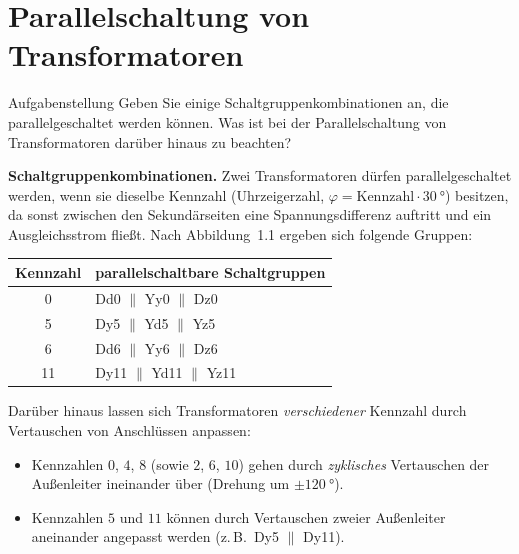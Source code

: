 \section{Parallelschaltung von Transformatoren}\label{sec:a1}

\begin{aufgabe}{Aufgabenstellung}
Geben Sie einige Schaltgruppenkombinationen an, die parallelgeschaltet werden können. Was ist bei der Parallelschaltung von Transformatoren darüber hinaus zu beachten?
\end{aufgabe}

\textbf{Schaltgruppenkombinationen.} Zwei Transformatoren dürfen parallelgeschaltet werden, wenn sie dieselbe Kennzahl (Uhrzeigerzahl, $\varphi = \text{Kennzahl}\cdot\SI{30}{\degree}$) besitzen, da sonst zwischen den Sekundärseiten eine Spannungsdifferenz auftritt und ein Ausgleichsstrom fließt. Nach Abbildung~1.1 ergeben sich folgende Gruppen:

\begin{center}
\begin{tabular}{@{}cl@{}}
\toprule
Kennzahl & parallelschaltbare Schaltgruppen\\
\midrule
0  & Dd0 $\parallel$ Yy0 $\parallel$ Dz0\\
5  & Dy5 $\parallel$ Yd5 $\parallel$ Yz5\\
6  & Dd6 $\parallel$ Yy6 $\parallel$ Dz6\\
11 & Dy11 $\parallel$ Yd11 $\parallel$ Yz11\\
\bottomrule
\end{tabular}
\end{center}

Darüber hinaus lassen sich Transformatoren \emph{verschiedener} Kennzahl durch Vertauschen von Anschlüssen anpassen:
\begin{itemize}[nosep]
  \item Kennzahlen $0$, $4$, $8$ (sowie $2$, $6$, $10$) gehen durch \emph{zyklisches} Vertauschen der Außenleiter ineinander über (Drehung um $\pm\SI{120}{\degree}$).
  \item Kennzahlen $5$ und $11$ können durch Vertauschen zweier Außenleiter aneinander angepasst werden (z.\,B.\ Dy5 $\parallel$ Dy11).
\end{itemize}

